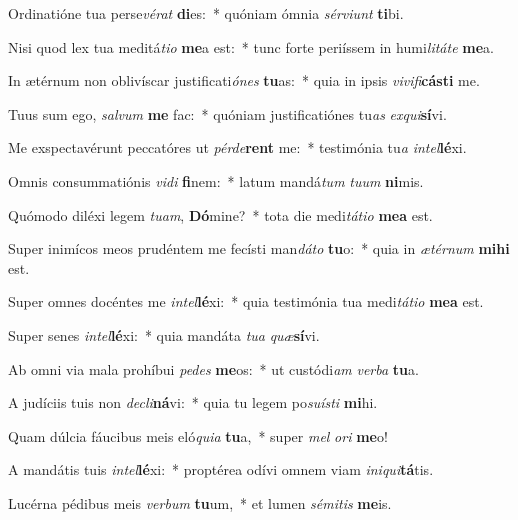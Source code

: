 \item Ordinatióne tua perse\textit{vé}\textit{rat} \textbf{di}es:~* quóniam ómnia \textit{sér}\textit{vi}\textit{unt} \textbf{ti}bi.
\item Nisi quod lex tua meditá\textit{ti}\textit{o} \textbf{me}a est:~* tunc forte periíssem in humi\textit{li}\textit{tá}\textit{te} \textbf{me}a.
\item In ætérnum non oblivíscar justificati\textit{ó}\textit{nes} \textbf{tu}as:~* quia in ipsis \textit{vi}\textit{vi}\textit{fi}\textbf{cás}\textbf{ti} me.
\item Tuus sum ego, \textit{sal}\textit{vum} \textbf{me} fac:~* quóniam justificatiónes tu\textit{as} \textit{ex}\textit{qui}\textbf{sí}vi.
\item Me exspectavérunt peccatóres ut \textit{pér}\textit{de}\textbf{rent} me:~* testimónia tu\textit{a} \textit{in}\textit{tel}\textbf{lé}xi.
\item Omnis consummatiónis \textit{vi}\textit{di} \textbf{fi}nem:~* latum mandá\textit{tum} \textit{tu}\textit{um} \textbf{ni}mis.
\item Quómodo diléxi legem \textit{tu}\textit{am}, \textbf{Dó}mine?~* tota die medi\textit{tá}\textit{ti}\textit{o} \textbf{me}\textbf{a} est.
\item Super inimícos meos prudéntem me fecísti man\textit{dá}\textit{to} \textbf{tu}o:~* quia in \textit{æ}\textit{tér}\textit{num} \textbf{mi}\textbf{hi} est.
\item Super omnes docéntes me \textit{in}\textit{tel}\textbf{lé}xi:~* quia testimónia tua medi\textit{tá}\textit{ti}\textit{o} \textbf{me}\textbf{a} est.
\item Super senes \textit{in}\textit{tel}\textbf{lé}xi:~* quia mandáta \textit{tu}\textit{a} \textit{quæ}\textbf{sí}vi.
\item Ab omni via mala prohíbui \textit{pe}\textit{des} \textbf{me}os:~* ut custódi\textit{am} \textit{ver}\textit{ba} \textbf{tu}a.
\item A judíciis tuis non \textit{de}\textit{cli}\textbf{ná}vi:~* quia tu legem po\textit{su}\textit{ís}\textit{ti} \textbf{mi}hi.
\item Quam dúlcia fáucibus meis eló\textit{qui}\textit{a} \textbf{tu}a,~* super \textit{mel} \textit{o}\textit{ri} \textbf{me}o!
\item A mandátis tuis \textit{in}\textit{tel}\textbf{lé}xi:~* proptérea odívi omnem viam \textit{in}\textit{i}\textit{qui}\textbf{tá}tis.
\item Lucérna pédibus meis \textit{ver}\textit{bum} \textbf{tu}um,~* et lumen \textit{sé}\textit{mi}\textit{tis} \textbf{me}is.
